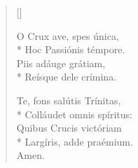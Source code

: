 \begin{multicols}{2}
\begin{verse}[\versewidth]

O Crux ave, spes única,                     \\*
Hoc Passiónis témpore.                   \\
Piis adáuge grátiam,                        \\*
Reísque dele crímina.                       

Te, fons salútis Trínitas,                  \\*
Colláudet omnis spíritus:                   \\
Quibus Crucis victóriam\\*
Largíris, adde praémium.\\
Amen.

\end{verse}
\end{multicols}
